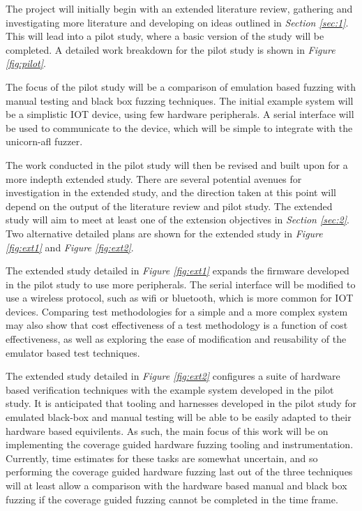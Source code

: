 \documentclass[11pt]{article}
\begin{document}
The project will initially begin with an extended literature
review, gathering and investigating more literature and developing on ideas
outlined in \textit{Section \ref{sec:1}}. This will lead into a pilot study,
where a basic version of the study will be completed. A detailed work breakdown
for the pilot study is shown in \textit{Figure \ref{fig:pilot}}.

The focus of the pilot study will be a comparison of emulation based fuzzing
with manual testing and black box fuzzing techniques. The initial example system will
be a simplistic IOT device, using few hardware peripherals. A serial interface
will be used to communicate to the device, which will be simple to integrate
with the unicorn-afl fuzzer.

The work conducted in the pilot study will then be revised and built upon for a
more indepth extended study. There are several potential avenues for
investigation in the extended study, and the direction taken at this point will
depend on the output of the literature review and pilot study. The extended
study will aim to meet at least one of the extension objectives in
\textit{Section \ref{sec:2}}. Two alternative detailed plans are shown for the
extended study in \textit{Figure \ref{fig:ext1}} and \textit{Figure
\ref{fig:ext2}}.

The extended study detailed in \textit{Figure \ref{fig:ext1}} expands the
firmware developed in the pilot study to use more peripherals. The serial
interface will be modified to use a wireless protocol, such as wifi or
bluetooth, which is more common for IOT devices. Comparing test methodologies
for a simple and a more complex system may also show that cost effectiveness of
a test methodology is a function of cost effectiveness, as well as exploring
the ease of modification and reusability of the emulator based test
techniques.

The extended study detailed in \textit{Figure \ref{fig:ext2}} configures a
suite of hardware based verification techniques with the example system
developed in the pilot study. It is anticipated that tooling and harnesses
developed in the pilot study for emulated black-box and manual testing will be
able to be easily adapted to their hardware based equivilents. As such, the
main focus of this work will be on implementing the coverage guided hardware
fuzzing tooling and instrumentation. Currently, time estimates for these tasks
are somewhat uncertain, and so performing the coverage guided hardware fuzzing
last out of the three techniques will at least allow a comparison with the
hardware based manual and black box fuzzing if the coverage guided fuzzing
cannot be completed in the time frame.
\end{document}
